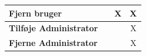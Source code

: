 \begin{table}[h]
\begin{tabular}{lccc}
\multicolumn{1}{|l|}{\textbf{Fjern bruger}}                                                                                   & \multicolumn{1}{c|}{}                & \multicolumn{1}{c|}{X}                      & \multicolumn{1}{c|}{X}              \\ \hline
\multicolumn{1}{|l|}{\textbf{Tilføje Administrator}}                                                                          & \multicolumn{1}{c|}{}                & \multicolumn{1}{c|}{}                       & \multicolumn{1}{c|}{X}              \\ \hline
\multicolumn{1}{|l|}{\textbf{Fjerne Administrator}}                                                                           & \multicolumn{1}{c|}{}                & \multicolumn{1}{c|}{}                       & \multicolumn{1}{c|}{X}              \\ \hline
\end{tabular}
\end{table}
